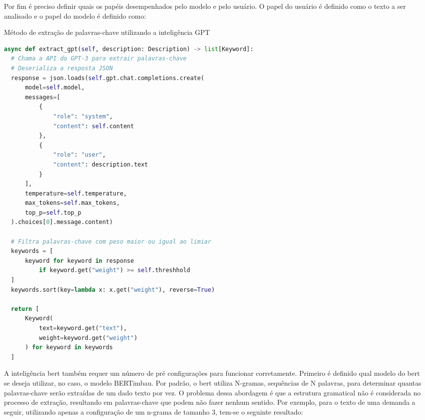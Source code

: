 Por fim é preciso definir quais os papéis desempenhados pelo modelo e pelo usuário. O papel do usuário é definido como o texto a ser analisado e o papel do modelo é definido como:


\begin{sourcecode}[H]
  \caption{\label{codigo:extract-gpt}Método de extração de palavras-chave utilizando a inteligência GPT}
  \begin{lstlisting}[frame=single, language=Python]
async def extract_gpt(self, description: Description) -> list[Keyword]:
  # Chama a API do GPT-3 para extrair palavras-chave
  # Deserializa a resposta JSON
  response = json.loads(self.gpt.chat.completions.create(
      model=self.model,
      messages=[
          {
              "role": "system",
              "content": self.content
          },
          {
              "role": "user",
              "content": description.text
          }
      ],
      temperature=self.temperature,
      max_tokens=self.max_tokens,
      top_p=self.top_p
  ).choices[0].message.content)

  # Filtra palavras-chave com peso maior ou igual ao limiar
  keywords = [
      keyword for keyword in response 
          if keyword.get("weight") >= self.threshhold
  ]
  keywords.sort(key=lambda x: x.get("weight"), reverse=True)

  return [
      Keyword(
          text=keyword.get("text"), 
          weight=keyword.get("weight")
      ) for keyword in keywords
  ]
\end{lstlisting}
  \fonte{}
\end{sourcecode}

A inteligência \gls{bert} também requer um número de pré configurações para funcionar corretamente. Primeiro é definido qual modelo do \gls{bert} se deseja utilizar, no caso, o modelo BERTimbau. Por padrão, o \gls{bert} utiliza N-gramas, sequências de N palavras, para determinar quantas palavras-chave serão extraídas de um dado texto por vez. O problema dessa abordagem é que a estrutura gramatical não é considerada no processo de extração, resultando em palavras-chave que podem não fazer nenhum sentido. Por exemplo, para o texto de uma demanda a seguir, utilizando apenas a configuração de um n-grama de tamanho 3, tem-se o seguinte resultado:

